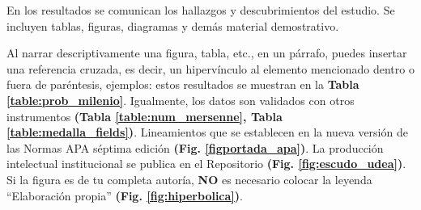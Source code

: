 En los resultados se comunican los hallazgos y descubrimientos del estudio. Se incluyen tablas, figuras, diagramas y demás material demostrativo.




 Al narrar descriptivamente una figura, tabla, etc., en un párrafo, puedes insertar una referencia cruzada, es decir, un hipervínculo al elemento mencionado dentro o fuera de paréntesis, ejemplos: estos resultados se muestran en la \textbf{Tabla \ref{table:prob_milenio}}.  Igualmente, los datos son validados con otros instrumentos \textbf{(Tabla \ref{table:num_mersenne}, Tabla \ref{table:medalla_fields})}. Lineamientos que se establecen en la nueva versión de las Normas APA séptima edición \textbf{(Fig. \ref{figportada_apa})}. La producción intelectual institucional se publica en el Repositorio \textbf{(Fig. \ref{fig:escudo_udea})}. Si la figura es de tu completa autoría, \textbf{NO} es necesario colocar la leyenda “Elaboración propia” \textbf{(Fig. \ref{fig:hiperbolica})}.



